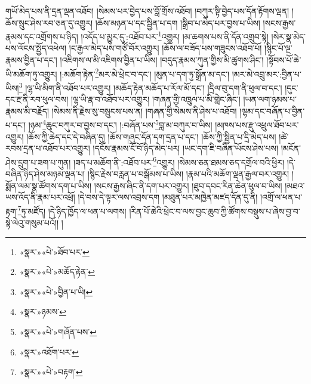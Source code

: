 \documentclass[12pt,a4paper]{book}
\begin{document}
གཡོ་མེད་པས་ནི་དྲན་ལྡན་འཐོབ། །སེམས་པར་བྱེད་པས་བློ་གྲོས་འཐོབ། །བཀུར་སྟི་བྱེད་པས་དོན་རྟོགས་ལྡན། །ཆོས་སྲུང་ཤེས་རབ་ཅན་དུ་འགྱུར། །ཆོས་མཉན་པ་དང་སྦྱིན་པ་དག །སྒྲིབ་པ་མེད་པར་བྱས་པ་ཡིས། །སངས་རྒྱས་རྣམས་དང་འགྲོགས་པ་ཉིད། །འདོད་པ་མྱུར་དུ་:འཐོབ་པར་\footnote{«སྣར་»«པེ་»ཐོབ་པར་}འགྱུར། །མ་ཆགས་པས་ནི་དོན་འགྲུབ་སྟེ། །སེར་སྣ་མེད་པས་ལོངས་སྤྱོད་འཕེལ། །ང་རྒྱལ་མེད་པས་གཙོ་བོར་འགྱུར། །ཆོས་ལ་བཟོད་པས་གཟུངས་འཐོབ་པོ། །སྙིང་པོ་ལྔ་རྣམས་བྱིན་པ་དང་། །འཇིགས་ལ་མི་འཇིགས་བྱིན་པ་ཡིས། །བདུད་རྣམས་ཀུན་གྱིས་མི་ཚུགས་ཤིང་། །སྟོབས་པོ་ཆེ་ཡི་མཆོག་ཏུ་འགྱུར། །:མཆོག་རྟེན་\footnote{«སྣར་»«པེ་»མཆོད་རྟེན་}མར་མེ་ཕྲེང་བ་དང་། །མུན་པ་དག་ཏུ་སྒྲོན་མ་དང་། །མར་མེ་འབྲུ་མར་:བྱིན་པ་ཡིས།\footnote{«སྣར་»«པེ་»བྱིན་པ་ཡི།} །ལྷ་ཡི་མིག་ནི་འཐོབ་པར་འགྱུར། །མཆོད་རྟེན་མཆོད་པ་རོལ་མོ་དང་། །དྲིལ་བུ་དག་ནི་ཕུལ་བ་དང་། །དུང་དང་རྔ་ནི་རབ་ཕུལ་བས། །ལྷ་ཡི་རྣ་བ་འཐོབ་པར་འགྱུར། །གཞན་གྱི་འཁྲུལ་པ་མི་གླེང་ཞིང་། །ཡན་ལག་ཉམས་པ་རྣམས་མི་བརྗོད། །སེམས་ནི་རྗེས་སུ་བསྲུངས་པས་ན། །གཞན་གྱི་སེམས་ནི་ཤེས་པ་འཐོབ། །ལྷམ་དང་བཞོན་པ་བྱིན་པ་དང་། །ཉམ་\footnote{«སྣར་»ཉམས་}ཆུང་བཀུར་བ་བྱས་བ་དང་། །:བཞོན་པས་\footnote{«སྣར་»«པེ་»གཞོན་པས་}བླ་མ་བཀུར་བ་ཡིས། །མཁས་པས་རྫུ་འཕྲུལ་ཐོབ་པར་འགྱུར། །ཆོས་ཀྱི་ཆེད་དང་དེ་བཞིན་དུ། །ཆོས་གཞུང་དོན་དག་དྲན་པ་དང་། །ཆོས་ཀྱི་སྦྱིན་པ་དྲི་མེད་པས། །ཚེ་རབས་དྲན་པ་འཐོབ་པར་འགྱུར། །དངོས་རྣམས་ངོ་བོ་ཉིད་མེད་པར། །ཡང་དག་ཇི་བཞིན་ཡོངས་ཤེས་པས། །མངོན་ཤེས་དྲུག་པ་ཟག་པ་ཀུན། །ཟད་པ་མཆོག་ནི་:འཐོབ་པར་\footnote{«སྣར་»འཐོག་པར་}འགྱུར། །སེམས་ཅན་ཐམས་ཅད་དགྲོལ་བའི་ཕྱིར། །དེ་བཞིན་ཉིད་ཤེས་མཉམ་ལྡན་པ། །སྙིང་རྗེས་བརླན་པ་བསྒོམས་པ་ཡིས། །རྣམ་པའི་མཆོག་ལྡན་རྒྱལ་བར་འགྱུར། །སྨོན་ལམ་སྣ་ཚོགས་དག་པ་ཡིས། །སངས་རྒྱས་ཞིང་ནི་དག་པར་འགྱུར། །ཐུབ་དབང་རིན་ཆེན་ཕུལ་བ་ཡིས། །མཐའ་ཡས་འོད་ནི་རྣམ་པར་འཕྲོ། །དེ་བས་དེ་ལྟར་ལས་འབྲས་དག །མཐུན་པར་མཁྱེན་མཛད་དོན་དུ་ནི། །འགྲོ་ལ་ཕན་པ་རྟག་\footnote{«སྣར་»«པེ་»བརྟག་}ཏུ་མཛོད། །དེ་ཉིད་ཁྱོད་ལ་ཕན་པ་ལགས། །རིན་པོ་ཆེའི་ཕྲེང་བ་ལས་བྱང་ཆུབ་ཀྱི་ཚོགས་བསྡུས་པ་ཞེས་བྱ་བ་སྟེ་ལེའུ་གསུམ་པའོ།། །
\end{document}
